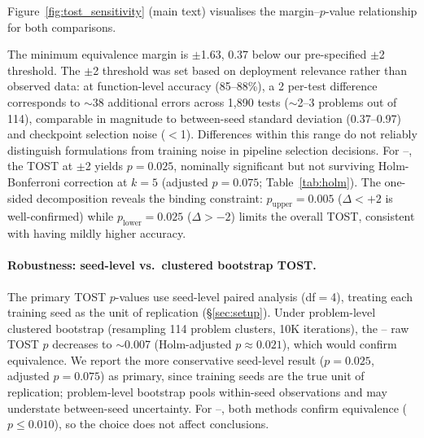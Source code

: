 Figure~\ref{fig:tost_sensitivity} (main text) visualises the margin--$p$-value relationship for both comparisons.

The minimum equivalence margin is $\pm$1.63\pp{}, 0.37\pp{} below our pre-specified $\pm$2\pp{} threshold. The $\pm$2\pp{} threshold was set based on deployment relevance rather than observed data: at function-level accuracy (85--88\%), a 2\pp{} per-test difference corresponds to ${\sim}$38 additional errors across 1,890 tests (${\sim}$2--3 problems out of 114), comparable in magnitude to between-seed standard deviation (0.37--0.97\pp{}) and checkpoint selection noise ($<$1\pp{}). Differences within this range do not reliably distinguish formulations from training noise in pipeline selection decisions. For \cls{}--\traj{}, the TOST at $\pm$2\pp{} yields $p{=}0.025$, nominally significant but not surviving Holm-Bonferroni correction at $k{=}5$ (adjusted $p{=}0.075$; Table~\ref{tab:holm}). The one-sided decomposition reveals the binding constraint: $p_{\text{upper}}{=}0.005$ ($\Delta < {+}2$\pp{} is well-confirmed) while $p_{\text{lower}}{=}0.025$ ($\Delta > {-}2$\pp{}) limits the overall TOST, consistent with \cls{} having mildly higher accuracy.

\paragraph{Robustness: seed-level vs.\ clustered bootstrap TOST.}
The primary TOST $p$-values use seed-level paired analysis (df${=}$4), treating each training seed as the unit of replication (\S\ref{sec:setup}). Under problem-level clustered bootstrap (resampling 114 problem clusters, 10K iterations), the \cls{}--\traj{} raw TOST $p$ decreases to ${\sim}$0.007 (Holm-adjusted $p{\approx}0.021$), which would confirm equivalence. We report the more conservative seed-level result ($p{=}0.025$, adjusted $p{=}0.075$) as primary, since training seeds are the true unit of replication; problem-level bootstrap pools within-seed observations and may understate between-seed uncertainty. For \cls{}--\cwm{}, both methods confirm equivalence ($p \leq 0.010$), so the choice does not affect conclusions.

